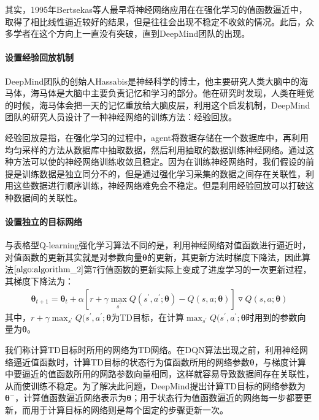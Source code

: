 其实，1995年Bertsekas等人最早将神经网络应用在在强化学习的值函数逼近中，取得了相比线性逼近较好的结果，但是往往会出现不稳定不收敛的情况\citep{bertsekas1995neuro}。此后，众多学者在这个方向上一直没有突破，直到DeepMind团队的出现。

 \paragraph{设置经验回放机制}
DeepMind团队的创始人Hassabis是神经科学的博士，他主要研究人类大脑中的海马体，海马体是大脑中主要负责记忆和学习的部分。他在研究时发现，人类在睡觉的时候，海马体会把一天的记忆重放给大脑皮层，利用这个启发机制，DeepMind团队的研究人员设计了一种神经网络的训练方法：经验回放。

经验回放是指，在强化学习的过程中，agent将数据存储在一个数据库中，再利用均匀采样的方法从数据库中抽取数据，然后利用抽取的数据训练神经网络。通过这种方法可以使的神经网络训练收敛且稳定。因为在训练神经网络时，我们假设的前提是训练数据是独立同分不的，但是通过强化学习采集的数据之间存在关联性，利用这些数据进行顺序训练，神经网络难免会不稳定。但是利用经验回放可以打破这种数据间的关联性。

 \paragraph{设置独立的目标网络}
与表格型Q-learning强化学习算法不同的是，利用神经网络对值函数进行逼近时，对值函数的更新其实就是对参数向量$\mathbf{\theta}$的更新，其更新方法时梯度下降法，因此算法$\ref{algo:algorithm_2}$第7行值函数的更新实际上变成了进度学习的一次更新过程，其梯度下降法为：
\begin{displaymath}
\begin{aligned}
\mathbf{\theta}_{t+1}=\mathbf{\theta}_{t}+\alpha[r+\gamma \max_{s^{'}}Q(s^{'},a^{'};\mathbf{\theta})-Q(s,a;\mathbf{\theta})]\triangledown Q(s,a;\mathbf{\theta})
\end{aligned}
\end{displaymath}
其中，$r+\gamma \max_{s^{'}}Q(s^{'},a^{'};\mathbf{\theta}$为TD目标，在计算$\max_{s^{'}}Q(s^{'},a^{'};\mathbf{\theta}$时用到的参数向量为$\mathbf{\theta}$。

我们称计算TD目标时所用的网络为TD网络。在DQN算法出现之前，利用神经网络逼近值函数时，计算TD目标的状态行为值函数所用的网络参数$\mathbf{\theta}$，与梯度计算中要逼近的值函数所用的网路参数向量相同，这样就容易导致数据间存在关联性，从而使训练不稳定。为了解决此问题，DeepMind提出计算TD目标的网络参数为$\mathbf{\theta}^{-}$，计算值函数逼近网络表示为$\mathbf{\theta}$；用于状态行为值函数逼近的网络每一步都要更新，而用于计算目标的网络则是每个固定的步骤更新一次。

